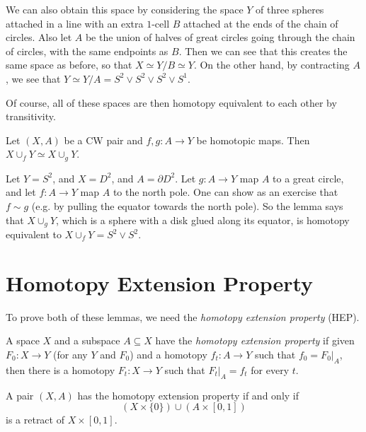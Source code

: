 \begin{exercise}
\begin{enumerate}
      We can also obtain this space by considering
      the space $Y$ of
      three spheres attached in a line with an extra
      $1$-cell $B$ attached at the ends of the chain
      of circles. Also let $A$ be the union of halves
      of great circles going through the chain of
      circles, with the same endpoints as $B$. Then
      we can see that this creates the same space as
      before, so that $X \simeq Y / B \simeq Y$.
      On the other hand, by contracting $A$, we see
      that $Y \simeq Y / A = S^2 \lor S^2 \lor S^2 \lor S^1$.

      Of course, all of these spaces are then homotopy
      equivalent to each other by transitivity.
  \end{enumerate}
\end{exercise}

\begin{lemma}\label{lem:lemma-3}
  Let $(X, A)$ be a CW pair and $f, g : A \to Y$ 
  be homotopic maps. Then $X \cup_f Y \simeq X \cup_g Y$.
\end{lemma}

\begin{example}
  Let $Y = S^2$, and $X = D^2$, and $A = \partial D^2$.
  Let $g : A \to Y$ map $A$ to a great circle, and
  let $f : A \to Y$ map $A$ to the north pole.
  One can show as an exercise that $f \sim g$ (e.g. by
  pulling the equator towards the north pole).
  So the lemma says that $X \cup_g Y$, which is a
  sphere with a disk glued along its equator, is homotopy
  equivalent to $X \cup_f Y = S^2 \lor S^2$.
\end{example}

\section{Homotopy Extension Property}
\begin{remark}
  To prove both of these lemmas, we need the
  \emph{homotopy extension property} (HEP).
\end{remark}

\begin{definition}
  A space $X$ and a subspace $A \subseteq X$ have the
  \emph{homotopy extension property} if given
  $F_0 : X \to Y$ (for any $Y$ and $F_0$) and a
  homotopy $f_t : A \to Y$ such that $f_0 = F_0|_A$,
  then there is a homotopy $F_t : X \to Y$ such that
  $F_t|_A = f_t$ for every $t$.
\end{definition}

\begin{lemma}\label{lem:lemma-4}
  A pair $(X, A)$ has the homotopy extension property
  if and only if
  \[
    (X \times \{0\}) \cup (A \times [0, 1])
  \]
  is a retract of $X \times [0, 1]$.
\end{lemma}

